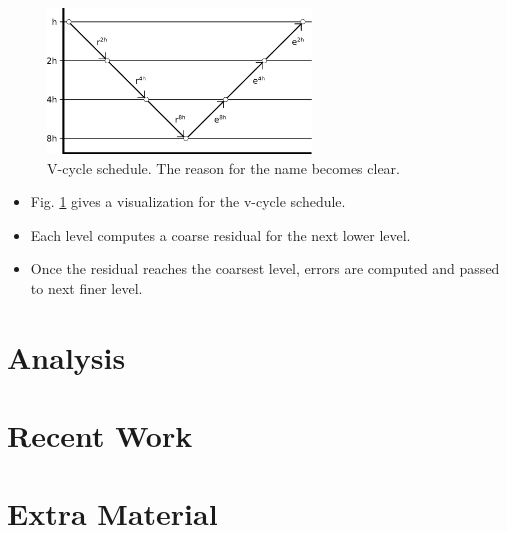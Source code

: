 \documentclass{beamer}
\begin{document}
\begin{frame}
 \begin{figure}
  \includegraphics[width=7cm]{images/vcycleSchedule.pdf}
  \caption{V-cycle schedule. The reason for the name becomes clear.}
  \label{fig:vcycleSchedule}
 \end{figure}

 \begin{itemize}
  \item Fig. \ref{fig:vcycleSchedule} gives a visualization for the v-cycle schedule.
  \item Each level computes a coarse residual for the next lower level.
  \item Once the residual reaches the coarsest level, errors are computed and
        passed to next finer level.
 \end{itemize}

\end{frame}

\section{Analysis}%

\section{Recent Work}%

\section*{Extra Material}%
\end{document}
